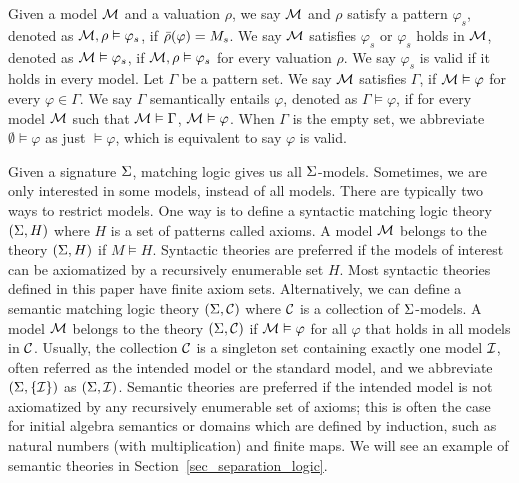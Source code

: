 \documentclass{amsart}
\begin{document}
Given a model $\mathcal{M}$ and a valuation $\rho$,
we say $\mathcal{M}$ and $\rho$ satisfy a pattern $\varphi_s$,
denoted as $\mathcal{M},\rho \vDash \varphi_s$,
if $\bar{\rho}(\varphi) = M_s$.
We say $\mathcal{M}$ satisfies $\varphi_s$
or $\varphi_s$ holds in $\mathcal{M}$,
denoted as $\mathcal{M} \vDash \varphi_s$,
if $\mathcal{M} , \rho \vDash \varphi_s$ for every valuation $\rho$.
We say $\varphi_s$ is valid if
it holds in every model.
Let $\Gamma$ be a pattern set.
We say $\mathcal{M}$ satisfies $\Gamma$, if
$\mathcal{M} \vDash \varphi$ for every $\varphi \in \Gamma$.
We say $\Gamma$ semantically entails $\varphi$,
denoted as $\Gamma \vDash \varphi$,
if for every model $\mathcal{M}$ such that $\mathcal{M} \vDash \Gamma$,
$\mathcal{M} \vDash \varphi$.
When $\Gamma$ is the empty set, we abbreviate
$\emptyset \vDash \varphi$ as just $\vDash \varphi$,
which is equivalent to say $\varphi$ is valid.


Given a signature ${\Sigma}$, matching logic gives us all ${\Sigma}$-models.
Sometimes, we are only interested in some models, instead of all models.
There are typically two ways to restrict models.
One way is to define a syntactic matching logic theory
$({\Sigma}, H)$ where $H$ is a set of patterns called axioms.
A model $\mathcal{M}$ belongs to the theory $({\Sigma}, H)$ if $M \vDash H$.
Syntactic theories are preferred if the models of interest can be
axiomatized by a recursively enumerable set $H$.
Most syntactic theories defined in this paper have finite axiom sets.
Alternatively, we can define a semantic matching logic theory
$({\Sigma}, \mathcal{C})$ where $\mathcal{C}$ is a collection of ${\Sigma}$-models.
A model $\mathcal{M}$ belongs to the theory $({\Sigma}, \mathcal{C})$ if
$\mathcal{M} \vDash \varphi$ for all $\varphi$ that holds in all models in $\mathcal{C}$.
Usually, the collection $\mathcal{C}$ is a singleton set containing exactly one model $\mathcal{I}$,
often referred as the intended model or the standard model,
and we abbreviate $({\Sigma}, \{ \mathcal{I} \})$ as $({\Sigma}, \mathcal{I})$.
Semantic theories are preferred if the intended model is not axiomatized by any
recursively enumerable set of axioms;
this is often the case for 
initial algebra semantics or domains which are defined by induction, such as
natural numbers (with multiplication) and finite maps.
We will see an example of semantic theories in Section~\ref{sec_separation_logic}.
\end{document}
